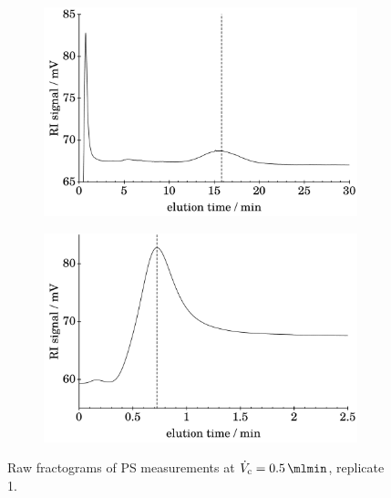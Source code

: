 \begin{figure}[H]
\begin{center}
  \begin{subfigure}{\subFigSize} 
    \includegraphics[width=\linewidth]{./images/data/img_PS_VC_05_rep1_te_RI.pdf}
    \label{subfig:raw_PS2_5_r1_te_RI}
  \end{subfigure}
  \begin{subfigure}{\subFigSize}
    \includegraphics[width=\linewidth]{./images/data/img_PS_VC_05_rep1_t0_RI.pdf}
\end{subfigure}
  \end{center}
\vspace*{-3ex}    
\caption[Raw fractograms of PS measurements at $\Vc = \SI{0.5}{\mlmin}$, replicate 1.]{
Raw fractograms of PS 
measurements at $\Vc = \SI{0.5}{\mlmin}$, replicate 1.}
\label{fig:raw_PS_0_5_rep1} 
\end{figure}
